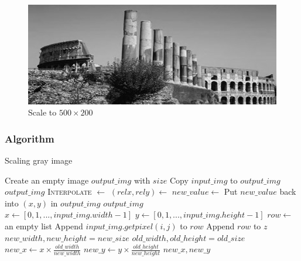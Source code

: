 \documentclass{article}
\begin{document}
\begin{figure}[H]
\centering
\includegraphics[width=375pt]{../result/scale-500-200.png}
\caption{Scale to $500 \times 200$}
\label{scale500}
\end{figure}

\subsubsection{Algorithm}
\label{sec:scalealgo}
\begin{algorithm}[H]
\centering
\caption{Scaling gray image}
\label{alg:scale}
  \begin{algorithmic}[1]
      \State Create an empty image $output\_img$ with $size$
        \State Copy $input\_img$ to $output\_img$
        \State \Return $output\_img$
	  \EndIf
      \State \textsc{Interpolate} $\gets$ 
      	\State $(relx, rely) \gets$ 
      	\State $new\_value \gets$ 
      	\State Put $new\_value$ back into $(x, y)$ in $output\_img$
      \EndFor
      \State \Return $output\_img$
    \EndFunction
    \\
      \State $x \gets [0, 1, ..., input\_img.width - 1]$
      \State $y \gets [0, 1, ..., input\_img.height - 1]$
      	  \State $row \gets$ an empty list
      	  \State Append $input\_img.getpixel(i, j)$ to $row$
      	\EndFor
      	\State Append $row$ to $z$
      \EndFor
      \State \Return {}
    \EndFunction
    \\
      \State $new\_width, new\_height = new\_size$
      \State $old\_width, old\_height = old\_size$
      \State $new\_x \gets x \times \frac{old\_width}{new\_width}$ 
      \State $new\_y \gets y \times \frac{old\_height}{new\_height}$ 
      \State \Return $new\_x, new\_y$
    \EndFunction
  \end{algorithmic}
\end{algorithm}
\end{document}
